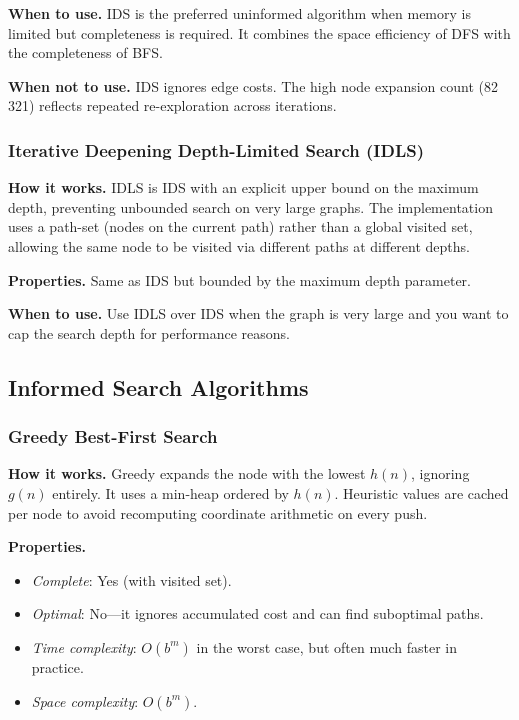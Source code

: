 ﻿\documentclass[a4paper, 12pt]{article}
\theoremstyle{remark}
\begin{document}
\textbf{When to use.} IDS is the preferred uninformed algorithm when memory is limited but completeness is required. It combines the space efficiency of DFS with the completeness of BFS.

\textbf{When not to use.} IDS ignores edge costs. The high node expansion count (82\,321) reflects repeated re-exploration across iterations.

\subsubsection{Iterative Deepening Depth-Limited Search (IDLS)}

\textbf{How it works.} IDLS is IDS with an explicit upper bound on the maximum depth, preventing unbounded search on very large graphs. The implementation uses a path-set (nodes on the current path) rather than a global visited set, allowing the same node to be visited via different paths at different depths.

\textbf{Properties.} Same as IDS but bounded by the maximum depth parameter.

\textbf{When to use.} Use IDLS over IDS when the graph is very large and you want to cap the search depth for performance reasons.

\subsection{Informed Search Algorithms}

\subsubsection{Greedy Best-First Search}

\textbf{How it works.} Greedy expands the node with the lowest $h(n)$, ignoring $g(n)$ entirely. It uses a min-heap ordered by $h(n)$. Heuristic values are cached per node to avoid recomputing coordinate arithmetic on every push.

\textbf{Properties.}
\begin{itemize}
    \item \emph{Complete}: Yes (with visited set).
    \item \emph{Optimal}: No---it ignores accumulated cost and can find suboptimal paths.
    \item \emph{Time complexity}: $O(b^m)$ in the worst case, but often much faster in practice.
    \item \emph{Space complexity}: $O(b^m)$.
\end{itemize}
\end{document}
